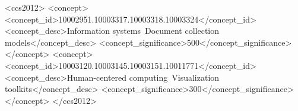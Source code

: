 \documentclass{sig-alternate-05-2015}
\begin{document}
%
\author{
%
%
\alignauthor
Allison J.B. Chaney\\
       \\
\alignauthor
Hanna Wallach\\
       \\
\and  %
\alignauthor 
David M. Blei\\
       \\
\alignauthor
Matthew Connelly\\
       \\
}
\maketitle
\begin{abstract}

\end{abstract}


%
%
\begin{CCSXML}
<ccs2012>
  <concept>
    <concept_id>10002951.10003317.10003318.10003324</concept_id>
    <concept_desc>Information systems~Document collection models</concept_desc>
    <concept_significance>500</concept_significance>
  </concept>
  <concept>
    <concept_id>10003120.10003145.10003151.10011771</concept_id>
    <concept_desc>Human-centered computing~Visualization toolkits</concept_desc>
    <concept_significance>300</concept_significance>
  </concept>
</ccs2012>
\end{CCSXML}
\end{document}
